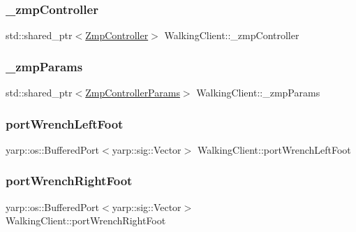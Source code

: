 \subsubsection{\texorpdfstring{\+\_\+zmp\+Controller}{\_zmpController}}
{\footnotesize\ttfamily std\+::shared\+\_\+ptr$<$\hyperlink{classZmpController}{Zmp\+Controller}$>$ Walking\+Client\+::\+\_\+zmp\+Controller\hspace{0.3cm}{\ttfamily [private]}}

\hypertarget{classWalkingClient_a20012b4bee7f6de8177ed53907f894cb}{}\label{classWalkingClient_a20012b4bee7f6de8177ed53907f894cb} 
\subsubsection{\texorpdfstring{\+\_\+zmp\+Params}{\_zmpParams}}
{\footnotesize\ttfamily std\+::shared\+\_\+ptr$<$\hyperlink{structZmpControllerParams}{Zmp\+Controller\+Params}$>$ Walking\+Client\+::\+\_\+zmp\+Params\hspace{0.3cm}{\ttfamily [private]}}

\hypertarget{classWalkingClient_a88ee63ff6a341eccd458d24700383457}{}\label{classWalkingClient_a88ee63ff6a341eccd458d24700383457} 
\subsubsection{\texorpdfstring{port\+Wrench\+Left\+Foot}{portWrenchLeftFoot}}
{\footnotesize\ttfamily yarp\+::os\+::\+Buffered\+Port$<$yarp\+::sig\+::\+Vector$>$ Walking\+Client\+::port\+Wrench\+Left\+Foot}

\hypertarget{classWalkingClient_a96321dc60e84c193f2dea6e85983ca67}{}\label{classWalkingClient_a96321dc60e84c193f2dea6e85983ca67} 
\subsubsection{\texorpdfstring{port\+Wrench\+Right\+Foot}{portWrenchRightFoot}}
{\footnotesize\ttfamily yarp\+::os\+::\+Buffered\+Port$<$yarp\+::sig\+::\+Vector$>$ Walking\+Client\+::port\+Wrench\+Right\+Foot}



